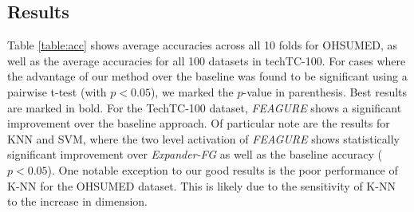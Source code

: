 \documentclass[twoside,11pt]{article}
\theoremstyle{definition}
\begin{document}

	
	


\subsection{Results}

Table \ref{table:acc} shows average accuracies across all 10 folds for OHSUMED, as well as the average accuracies for all 100 datasets in techTC-100. For cases where the advantage of our method over the baseline was found to be significant using a pairwise t-test (with $p<0.05$), we marked the $p$-value in parenthesis. Best results are marked in bold.
For the TechTC-100 dataset, \emph{FEAGURE} shows a significant improvement over the baseline approach. %
Of particular note are the results for KNN and SVM, where the two level activation of \emph{FEAGURE} shows statistically significant improvement over \emph{Expander-FG} as well as the baseline accuracy ($p < 0.05$). 
One notable exception to our good results is the poor performance of K-NN for the OHSUMED dataset. This is likely due to the sensitivity of K-NN to the increase in dimension. 
\end{document}
